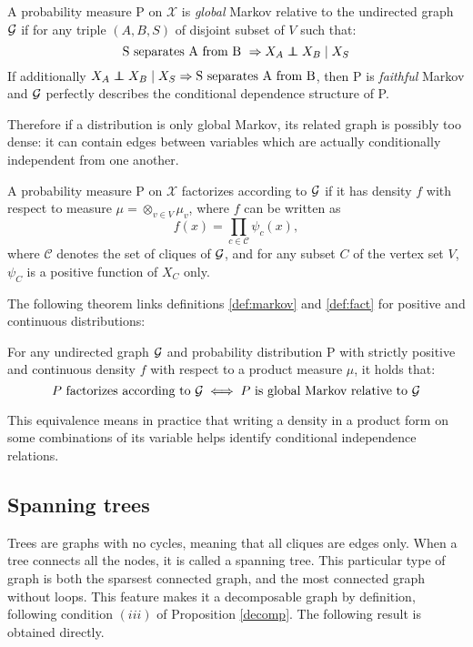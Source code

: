 \begin{definition}\label{def:markov}
A probability measure P on $\mathcal{X}$ is \textit{global} Markov relative to the undirected graph $\mathcal{G}$ if for any triple $(A, B, S)$ of disjoint subset of $V$ such that:
 $$ \text{S separates A from B } \Rightarrow X_A\independent X_B \mid X_S$$
 If additionally $X_A\independent X_B \mid X_S \Rightarrow \text{S separates A from B}  $, then P is \textit{faithful} Markov and $\mathcal{G}$ perfectly describes the conditional dependence structure of P.
\end{definition}
Therefore if a distribution is only global Markov, its related graph is possibly too dense: it can contain edges between variables which are actually conditionally independent from one another. 
\begin{definition}[Factorization]\label{def:fact}
A probability measure P on $\mathcal{X}$ factorizes according to $\mathcal{G}$ if it has density $f$ with respect to measure $\mu = \otimes_{v\in V} \mu_v$, where $f$ can be written as
$$f(x) = \prod_{c\in \mathcal{C} }\psi_c(x),$$
where $\mathcal{C}$ denotes the set of cliques of $\mathcal{G}$, and for any subset $C$ of the vertex set $V$, $\psi_C$ is a positive function of $X_C$ only.
\end{definition}
The following theorem links definitions \ref{def:markov} and \ref{def:fact} for positive and continuous distributions:

\begin{theorem} \label{thm:ham}
For any undirected graph $\mathcal{G}$ and probability distribution P with strictly positive and continuous density $f$ with respect to a product measure $\mu$, it holds that:
$$P\text{ factorizes according to } \mathcal{G} \iff P\text{ is global Markov relative to }\mathcal{G} $$
\end{theorem}

This equivalence means in practice that writing a density in a product form on some combinations of its variable helps identify conditional independence relations.

 \subsection{Spanning trees}
Trees are graphs with no cycles, meaning that all cliques are edges only. When a tree connects all the nodes, it is called a spanning tree. This particular type of graph is both the sparsest connected graph, and the most connected graph without loops. This feature makes it a decomposable graph by definition, following condition $(iii)$ of Proposition \ref{decomp}.  The following result is obtained directly.


